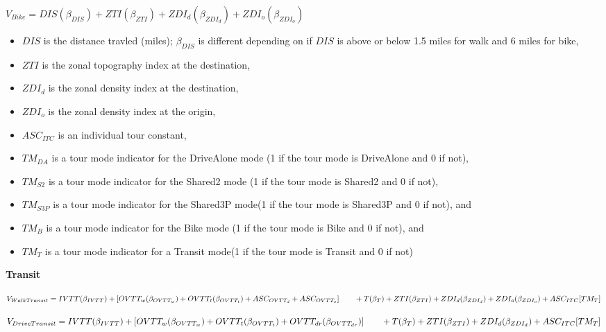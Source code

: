 \documentclass[12pt, oneside, openright]{byuthesis}
\providecommand{\tightlist}{%
  \setlength{\itemsep}{0pt}\setlength{\parskip}{0pt}}
\begin{document}
\(V_{Bike} = DIS(\beta_{DIS}) + ZTI(\beta_{ZTI}) + ZDI_d(\beta_{ZDI_d}) + ZDI_o(\beta_{ZDI_o})\)

\begin{itemize}
\tightlist
\item
  \(DIS\) is the distance travled (miles); \(\beta_{DIS}\) is different depending on if \(DIS\) is above or below 1.5 miles for walk and 6 miles for bike,
\item
  \(ZTI\) is the zonal topography index at the destination,
\item
  \(ZDI_d\) is the zonal density index at the destination,
\item
  \(ZDI_o\) is the zonal density index at the origin,
\item
  \(ASC_{ITC}\) is an individual tour constant,
\item
  \(TM_{DA}\) is a tour mode indicator for the DriveAlone mode (1 if the tour mode is DriveAlone and 0 if not),
\item
  \(TM_{S2}\) is a tour mode indicator for the Shared2 mode (1 if the tour mode is Shared2 and 0 if not),
\item
  \(TM_{S3P}\) is a tour mode indicator for the Shared3P mode(1 if the tour mode is Shared3P and 0 if not), and
\item
  \(TM_{B}\) is a tour mode indicator for the Bike mode (1 if the tour mode is Bike and 0 if not), and
\item
  \(TM_{T}\) is a tour mode indicator for a Transit mode(1 if the tour mode is Transit and 0 if not)
\end{itemize}

\textbf{Transit}

\(V_{WalkTransit} = IVTT(\beta_{IVTT}) + [OVTT_w(\beta_{OVTT_w}) + OVTT_t(\beta_{OVTT_t}) + ASC_{OVTT_d} + ASC_{OVTT_o}] \\ \qquad + T(\beta_T) + ZTI(\beta_{ZTI}) + ZDI_d(\beta_{ZDI_d}) + ZDI_o(\beta_{ZDI_o}) + ASC_{ITC}[TM_T]\)

\(V_{DriveTransit} = IVTT(\beta_{IVTT}) + [OVTT_w(\beta_{OVTT_w}) + OVTT_t(\beta_{OVTT_t}) + OVTT_{dr}(\beta_{OVTT_{dr}})] \\ \qquad + T(\beta_T) + ZTI(\beta_{ZTI}) + ZDI_d(\beta_{ZDI_d}) + ASC_{ITC}[TM_T]\)
\end{document}
